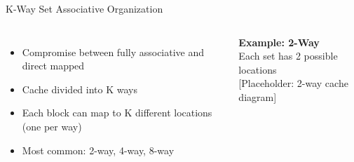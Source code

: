 \documentclass[aspectratio=169,12pt]{beamer}
\begin{document}
\begin{frame}{K-Way Set Associative Organization}
\begin{columns}
\begin{itemize}
    \item Compromise between fully associative and direct mapped
    \item Cache divided into K ways
    \item Each block can map to K different locations (one per way)
    \item Most common: 2-way, 4-way, 8-way
\end{itemize}

\begin{tcolorbox}[colback=gray!10]
\textbf{Example: 2-Way}\\
Each set has 2 possible locations\\
\vspace{0.3cm}
[Placeholder: 2-way cache diagram]
\end{tcolorbox}
\end{columns}
\end{frame}
\end{document}
